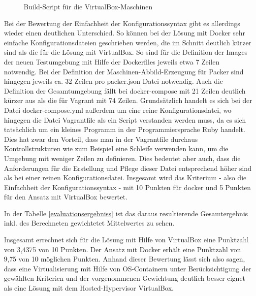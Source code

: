 \begin{figure}[!ht]
  \begin{center}
    \caption{Build-Script für die VirtualBox-Maschinen}
    \label{buildvb}
  \end{center}
\end{figure}

Bei der Bewertung der Einfachheit der Konfigurationssyntax gibt es allerdings wieder einen deutlichen Unterschied. So können bei der Lösung mit Docker sehr einfache Konfigurationsdateien geschrieben werden, die im Schnitt deutlich kürzer sind als die für die Lösung mit VirtualBox. So sind für die Definition der Images der neuen Testumgebung mit Hilfe der Dockerfiles jeweils etwa 7 Zeilen notwendig. Bei der Definition der Maschinen-Abbild-Erzeugung für Packer sind hingegen jeweils ca. 32 Zeilen pro packer.json-Datei notwendig. Auch die Definition der Gesamtumgebung fällt bei docker-compose mit 21 Zeilen deutlich kürzer aus als die für Vagrant mit 74 Zeilen. Grundsätzlich handelt es sich bei der Datei docker-compose.yml außerdem um eine reine Konfigurationsdatei, wo hingegen die Datei Vagrantfile als ein Script verstanden werden muss, da es sich tatsächlich um ein kleines Programm in der Programmiersprache Ruby handelt. Dies hat zwar den Vorteil, dass man in der Vagrantfile durchaus Kontrollstrukturen wie zum Beispiel eine Schleife verwenden kann, um die Umgebung mit weniger Zeilen zu definieren. Dies bedeutet aber auch, dass die Anforderungen für die Erstellung und Pflege dieser Datei entsprechend höher sind als bei einer reinen Konfigurationsdatei. Insgesamt wird das Kriterium - also die Einfachheit der Konfigurationssyntax - mit 10 Punkten für docker  und 5 Punkten für den Ansatz mit VirtualBox bewertet.

In der Tabelle \ref{evaluationsergebniss} ist das daraus resultierende Gesamtergebnis inkl. des Berechneten gewichtetet Mittelwertes zu sehen.

Insgesamt errechnet sich für die Lösung mit Hilfe von VirtualBox eine Punktzahl von 3,4375 von 10 Punkten. Der Ansatz mit Docker erhält eine Punktzahl von 9,75 von 10 möglichen Punkten. Anhand dieser Bewertung lässt sich also sagen, dass eine Virtualisierung mit Hilfe von OS-Containern unter Berücksichtigung der gewählten Kriterien und der vorgenommenen Gewichtung deutlich besser eignet als eine Lösung mit dem Hosted-Hypervisor VirtualBox.

